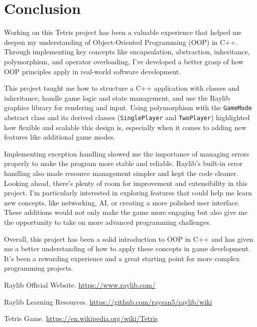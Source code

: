 \documentclass{article}
\begin{document}
\section{Conclusion}

Working on this Tetris project has been a valuable experience that helped me deepen my understanding of Object-Oriented Programming (OOP) in C++. Through implementing key concepts like encapsulation, abstraction, inheritance, polymorphism, and operator overloading, I’ve developed a better grasp of how OOP principles apply in real-world software development.

This project taught me how to structure a C++ application with classes and inheritance, handle game logic and state management, and use the Raylib graphics library for rendering and input. Using polymorphism with the \texttt{GameMode} abstract class and its derived classes (\texttt{SinglePlayer} and \texttt{TwoPlayer}) highlighted how flexible and scalable this design is, especially when it comes to adding new features like additional game modes.

Implementing exception handling showed me the importance of managing errors properly to make the program more stable and reliable. Raylib’s built-in error handling also made resource management simpler and kept the code cleaner.\\

Looking ahead, there’s plenty of room for improvement and extensibility in this project. I’m particularly interested in exploring features that could help me learn new concepts, like networking, AI, or creating a more polished user interface. These additions would not only make the game more engaging but also give me the opportunity to take on more advanced programming challenges.

Overall, this project has been a solid introduction to OOP in C++ and has given me a better understanding of how to apply these concepts in game development. It’s been a rewarding experience and a great starting point for more complex programming projects.

\newpage
\begin{thebibliography}{9}

Raylib Official Website. \url{https://www.raylib.com/}

Raylib Learning Resources. \url{https://github.com/raysan5/raylib/wiki}

Tetris Game. \url{https://en.wikipedia.org/wiki/Tetris}
\end{thebibliography}
\end{document}
